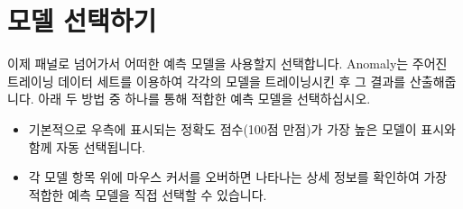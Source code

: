 \documentclass[letterpaper,10pt,english]{sphinxmanual}
\begin{document}
\section{모델 선택하기}
\label{\detokenize{anomaly/part02/index:select-model}}\label{\detokenize{anomaly/part02/index:id5}}
이제  패널로 넘어가서 어떠한 예측 모델을 사용할지 선택합니다. Anomaly는 주어진 트레이닝 데이터 세트를 이용하여 각각의 모델을 트레이닝시킨 후 그 결과를 산출해줍니다. 아래 두 방법 중 하나를 통해 적합한 예측 모델을 선택하십시오.
\begin{itemize}
\item {} 
기본적으로 우측에 표시되는 정확도 점수(100점 만점)가 가장 높은 모델이  표시와 함께 자동 선택됩니다.
\begin{quote}

\begin{figure}[H]
\centering

\noindent{}
\end{figure}
\end{quote}

\item {} 
각 모델 항목 위에 마우스 커서를 오버하면 나타나는 상세 정보를 확인하여 가장 적합한 예측 모델을 직접 선택할 수 있습니다.
\begin{quote}

\begin{figure}[H]
\centering

\noindent{}
\end{figure}
\end{quote}

\end{itemize}
\end{document}
